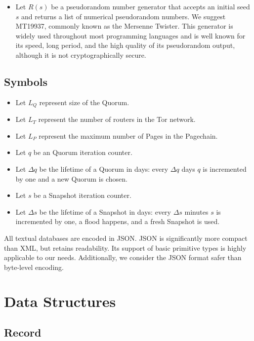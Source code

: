 \begin{itemize}
	\item Let $ \mathit{R}(s) $ be a pseudorandom number generator that accepts an initial seed $ s $ and returns a list of numerical pseudorandom numbers. We suggest MT19937, commonly known as the Mersenne Twister. This generator is widely used throughout most programming languages and is well known for its speed, long period, and the high quality of its pseudorandom output, although it is not cryptographically secure.\cite{matsumoto1998mersenne}
\end{itemize}

\subsection{Symbols}

\begin{itemize}
	\item Let $ L_{Q} $ represent size of the Quorum.
	\item Let $ L_{T} $ represent the number of routers in the Tor network.
	\item Let $ L_{P} $ represent the maximum number of Pages in the Pagechain.
	\item Let $ q $ be an Quorum iteration counter.
	\item Let $ \Delta q $ be the lifetime of a Quorum in days: every $ \Delta q $ days $ q $ is incremented by one and a new Quorum is chosen.
	\item Let $ s $ be a Snapshot iteration counter.
	\item Let $ \Delta s $ be the lifetime of a Snapshot in days: every $ \Delta s $ minutes $ s $ is incremented by one, a flood happens, and a fresh Snapshot is used.
\end{itemize}

All textual databases are encoded in JSON. JSON is significantly more compact than XML, but retains readability. Its support of basic primitive types is highly applicable to our needs. Additionally, we consider the JSON format safer than byte-level encoding.

\section{Data Structures}
\label{sec:DataStructures}

\subsection{Record}
\label{sec:Record}

